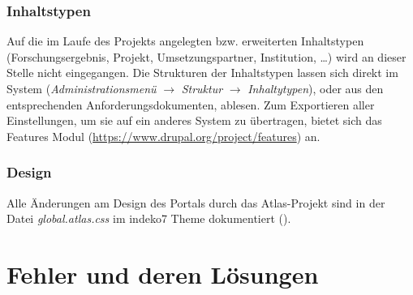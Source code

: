 \subsubsection{Inhaltstypen}\label{subsub:inhaltstypen}
Auf die im Laufe des Projekts angelegten bzw. erweiterten Inhaltstypen (Forschungsergebnis, Projekt, Umsetzungspartner, Institution, \dots) wird an dieser Stelle nicht eingegangen. Die Strukturen der Inhaltstypen lassen sich direkt im System (\textit{Administrationsmenü} $\rightarrow$ \textit{Struktur} $\rightarrow$  \textit{Inhaltytypen}), oder aus den entsprechenden Anforderungsdokumenten, ablesen. Zum Exportieren aller Einstellungen, um sie auf ein anderes System zu übertragen, bietet sich \zB das Features Modul (\url{https://www.drupal.org/project/features}) an. 




\subsubsection{Design}\label{subsub:cssdesign}
Alle Änderungen am Design des Portals durch das Atlas-Projekt sind in der Datei \textit{global.atlas.css} im indeko7 Theme dokumentiert ().




\newpage
\section{Fehler und deren Lösungen}\label{sec:problems}

